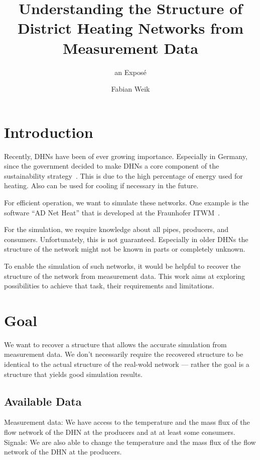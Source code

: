 \documentclass{scrartcl}
\title{Understanding the Structure of District Heating Networks from Measurement Data}
\subtitle{an Exposé}
\author{Fabian Weik}
\begin{document}
    \maketitle

    \section{Introduction}

    Recently, \acp{DHN} have been of ever growing importance.
    Especially in Germany, since the government decided to make \acp{DHN} a core component of the sustainability strategy~\cite{regierung2024heatingplanning}.
    This is due to the high percentage of energy used for heating.
    Also can be used for cooling if necessary in the future.

    For efficient operation, we want to simulate these networks.
    One example is the software ``AD Net Heat'' that is developed at the Fraunhofer ITWM~\cite{adnetheat}.

    For the simulation, we require knowledge about all pipes, producers, and consumers.
    Unfortunately, this is not guaranteed.
    Especially in older \acp{DHN} the structure of the network might not be known in parts or completely unknown.

    To enable the simulation of such networks, it would be helpful to recover the structure of the network from measurement data.
    This work aims at exploring possibilities to achieve that task, their requirements and limitations.

    \section{Goal}

    We want to recover a structure that allows the accurate simulation from measurement data.
    We don't necessarily require the recovered structure to be identical to the actual structure of the real-wold network --- rather  the goal is a structure that yields good simulation results.

    \subsection{Available Data}

    Measurement data: We have access to the temperature and the mass flux of the flow network of the \ac{DHN} at the producers and at at least some consumers.
    Signals: We are also able to change the temperature and the mass flux of the flow network of the \ac{DHN} at the producers.
\end{document}
